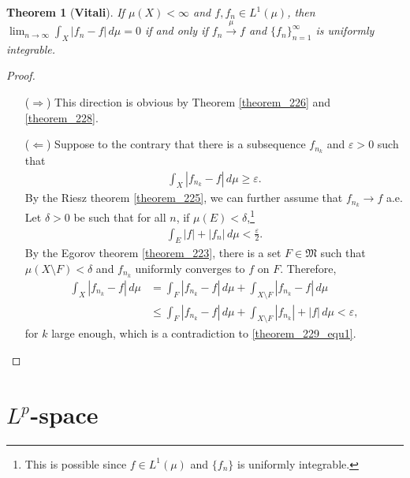 \documentclass[11pt]{book}
\newtheorem{theorem}{Theorem}[chapter]
\theoremstyle{definition}
\numberwithin{equation}{chapter}
\begin{document}
\begin{theorem}[{\bf Vitali}]
If $\mu(X) < \infty$ and $f,f_n \in L^1(\mu)$, then $\lim_{n\to\infty}\int_X \left|f_n - f\right|\,d\mu = 0$ if and only if $f_n \xrightarrow[]{\mu} f$ and $\{f_n\}^\infty_{n=1}$ is uniformly integrable.
\end{theorem}
\begin{proof}
~\begin{enumerate}
    \item[($\Rightarrow$)] This direction is obvious by Theorem \ref{theorem_226} and  \ref{theorem_228}.
    
    \item[($\Leftarrow$)] Suppose to the contrary that there is a subsequence $f_{n_k}$ and $\varepsilon > 0$ such that
    \begin{align}\label{theorem_229_equ1}
        \int_X \left|f_{n_k} - f\right|\,d\mu \geq \varepsilon.
    \end{align}
    By the Riesz theorem \ref{theorem_225}, we can further assume that $f_{n_k} \to f$ a.e. Let $\delta > 0$ be such that for all $n$, if $\mu(E) < \delta$,\footnote{This is possible since $f \in L^1(\mu)$ and $\{f_n\}$ is uniformly integrable.}
    \begin{align*}
        \int_E \left|f\right| + \left|f_n\right| \, d\mu < \frac{\varepsilon}{2}.
    \end{align*}
    By the Egorov theorem \ref{theorem_223}, there is a set $F \in \mathfrak{M}$ such that $\mu(X \setminus F) < \delta$ and $f_{n_k}$ uniformly converges to $f$ on $F$. Therefore, 
    \begin{align*}
        \int_X \left|f_{n_k} - f\right|\,d\mu & = \int_F \left|f_{n_k} - f\right|\,d\mu + \int_{X \setminus F} \left|f_{n_k} - f\right|\,d\mu \\
        & \leq \int_F \left|f_{n_k} - f\right|\,d\mu + \int_{X \setminus F} \left|f_{n_k}\right| + \left|f\right|\,d\mu < \varepsilon,
    \end{align*}
    for $k$ large enough, which is a contradiction to \eqref{theorem_229_equ1}. 
\end{enumerate}
\end{proof}



\medskip


\chapter{$L^p$-space}
\end{document}
